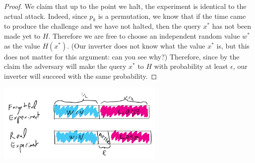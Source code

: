 \begin{proof}
We claim that up to the point we halt, the experiment is identical to
the actual attack. Indeed, since \(p_k\) is a permutation, we know that
if the time came to produce the challenge and we have not halted, then
the query \(x^*\) has not been made yet to \(H\). Therefore we are free
to choose an independent random value \(w^*\) as the value \(H(x^*)\).
(Our inverter does not know what the value \(x^*\) is, but this does not
matter for this argument: can you see why?) Therefore, since by the
claim the adversary will make the query \(x^*\) to \(H\) with
probability at least \(\epsilon\), our inverter will succeed with the
same probability.

\end{proof}

\begin{marginfigure}
\centering
\includegraphics[width=\linewidth, height=1.5in, keepaspectratio]{../figure/gnomeTDPENC.png}
\caption{In the proof of security of TDPENC, we show that if the
assumption of the claim is violated, the ``forgetful experiment'' is
identical to the real experiment with probability larger \(1-\epsilon\).
In such a case, even if all that probability mass was on the points in
the sample space where the adversary in the forgetful experiment will
lose and the adversary of the real experiment will win, the probability
of winning in the latter experiment would still be less than
\(1/2+\epsilon\).}
\label{TDPENCgnomefig}
\end{marginfigure}


\hypertarget{noromtdpthm}{}

